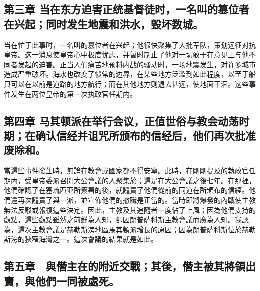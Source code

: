 
\subsection{第三章 当在东方迫害正统基督徒时，一名叫的篡位者在兴起；同时发生地震和洪水，毁坏数城。}

当在忙于此事时，一名叫的篡位者在兴起；他很快聚集了大批军队，策划远征对抗皇帝。这一消息使皇帝心中极度忧虑，并暂时制止了他对一切敢于在意见上与他不同者发起的迫害。正当人们痛苦地预料内战的骚动时，一场地震发生，对许多城市造成严重破坏。海水也改变了惯常的边界，在某些地方泛滥到如此程度，以至于船只可以在以前是道路的地方航行；而在其他地方则退去甚远，使地面干涸。这些事件发生在两位皇帝的第一次执政官任期内。\par


\subsection{第四章 马其顿派在举行会议，正值世俗与教会动荡时期；在确认信经并诅咒所颁布的信经后，他们再次批准废除和。}

當這些事件發生時，無論在教會或國家都不得安寧。此時，在剛剛提及的執政官任期內，受皇帝委派召開大公會議的人聚集於；這是在大公會議之後七年。在那裡，他們確認了在塞琉西亚所簽署的後，就譴責了他們從前的同道在所頒布的信經。他們還再次譴責了與一派，並宣佈他們的撤職是正當的。當時即將爆發的內戰使主教無法反駁或報復這些決定。因此，主教及其追隨者一度佔了上風；因為他們支持的觀點，這些觀點雖然之前鮮為人知，卻因朗普萨科斯主教會議而廣為人知。我認為，這次主教會議是赫勒斯滂地區馬其頓派增長的原因；因為朗普萨科斯位於赫勒斯滂的狹窄海灣之一。這次會議的結果就是如此。\par


\subsection{第五章　與僭主在的附近交戰；其後，僭主被其將領出賣，與他們一同被處死。}

